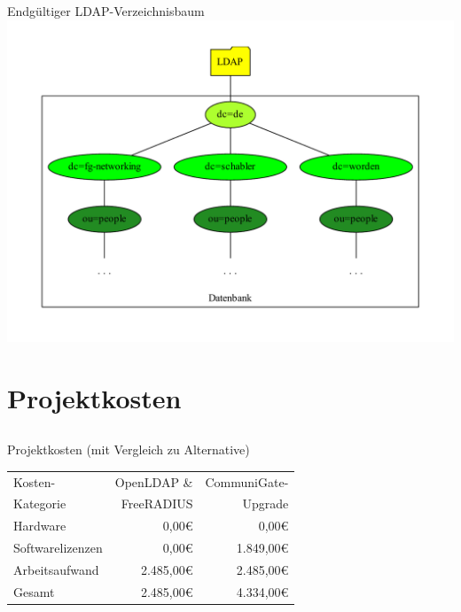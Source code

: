\documentclass[handout,svgnames]{beamer}
\newcommand{\mcc}[2]{\multicolumn{#1}{|c|}{#2}} %
\begin{document}
\begin{frame}{Endgültiger LDAP-Verzeichnisbaum}
		\includegraphics[width=\textwidth]{Bilder/LDAP-fgn.pdf}
\end{frame}


\section{Projektkosten}
\subsection{}
\begin{frame}{Projektkosten (mit Vergleich zu Alternative)}
\begin{table}
\centering
	\begin{tabularx}{0.8\textwidth}{|X|r|r|}
		\hline
		Kosten-	&	OpenLDAP \& &	CommuniGate-\\
		Kategorie	&	FreeRADIUS &	Upgrade\\
		\hline
		Hardware &	0,00\euro{} &	0,00\euro{}\\
		\hline
		Softwarelizenzen &	0,00\euro{} &	1.849,00\euro{}\\
		\hline
		Arbeitsaufwand &	2.485,00\euro{} &	2.485,00\euro{}\\
		\hhline{|=|=|=|}
		Gesamt &	2.485,00\euro{} &	4.334,00\euro{}\\
		\hline
	\end{tabularx}
\end{table}
\end{frame}
\end{document}
